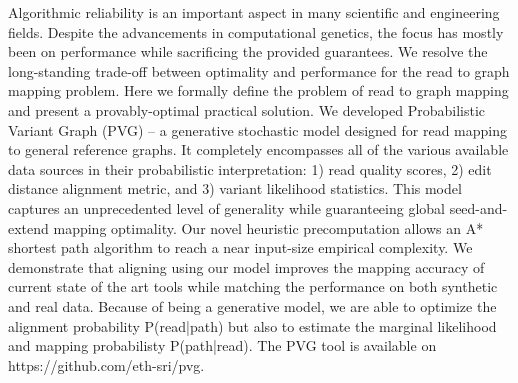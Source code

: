 Algorithmic reliability is an important aspect in many scientific and engineering fields.
Despite the advancements in computational genetics, the focus has mostly been on performance while sacrificing the provided guarantees.
We resolve the long-standing trade-off between optimality and performance for the read to graph mapping problem.
Here we formally define the problem of read to graph mapping and present a provably-optimal practical solution.
We developed Probabilistic Variant Graph (PVG) – a generative stochastic model designed for read mapping to general reference graphs.
It completely encompasses all of the various available data sources in their probabilistic interpretation:
	1) read quality scores, 2) edit distance alignment metric, and 3) variant likelihood statistics.
This model captures an unprecedented level of generality while guaranteeing global seed-and-extend mapping optimality.
Our novel heuristic precomputation allows an A* shortest path algorithm to reach a near input-size empirical complexity.
We demonstrate that aligning using our model improves the mapping accuracy of current state of the art tools while matching the performance on both synthetic and real data.
Because of being a generative model, we are able to optimize the alignment probability P(read|path) but also to estimate the marginal likelihood and mapping probabilisty P(path|read).
The PVG tool is available on https://github.com/eth-sri/pvg.

